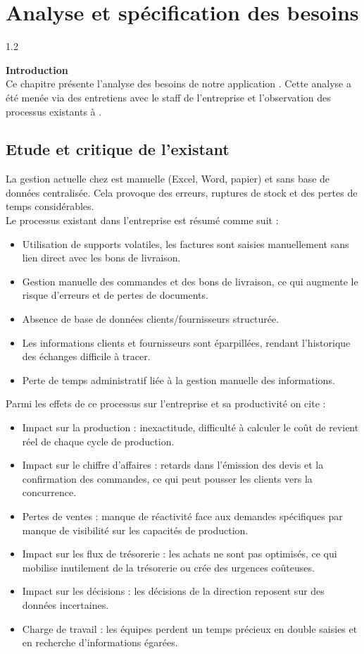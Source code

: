 \chapter{Analyse et spécification des besoins}
\begin{spacing}{1.2}
\minitoc
\thispagestyle{MyStyle}
\end{spacing}
\newpage

{\Large\bfseries Introduction}\\
Ce chapitre présente l'analyse des besoins de notre application \reportAppName{}. Cette analyse a été menée via des entretiens avec le staff de l'entreprise et l'observation des processus existants à \reportEntreprise.
\section{Etude et critique de l’existant}
La gestion actuelle chez \reportEntreprise est manuelle (Excel, Word, papier) et sans base de données centralisée. Cela provoque des erreurs, ruptures de stock et des pertes de temps considérables.\\
Le processus existant dans l'entreprise est résumé comme suit :
\begin{itemize}
\item Utilisation de supports volatiles, les factures sont saisies manuellement sans lien direct avec les bons de livraison.
\item Gestion manuelle des commandes et des bons de livraison, ce qui augmente le risque d'erreurs et de pertes de documents.
\item Absence de base de données clients/fournisseurs structurée.
\item Les informations clients et fournisseurs sont éparpillées, rendant l'historique des échanges difficile à tracer.
\item Perte de temps administratif liée à la gestion manuelle des informations.
\end{itemize}

Parmi les effets de ce processus sur l'entreprise et sa productivité on cite :
\begin{itemize}
 \item Impact sur la production : inexactitude, difficulté à calculer le coût de revient réel de chaque cycle de production.
 \item Impact sur le chiffre d'affaires : retards dans l'émission des devis et la confirmation des commandes, ce qui peut pousser les clients vers la concurrence.
 \item Pertes de ventes : manque de réactivité face aux demandes spécifiques par manque de visibilité sur les capacités de production.
 \item Impact sur les flux de trésorerie : les achats ne sont pas optimisés, ce qui mobilise inutilement de la trésorerie ou crée des urgences coûteuses.
 \item Impact sur les décisions : les décisions de la direction reposent sur des données incertaines.
 \item Charge de travail : les équipes perdent un temps précieux en double saisies et en recherche d'informations égarées.
\end{itemize}

